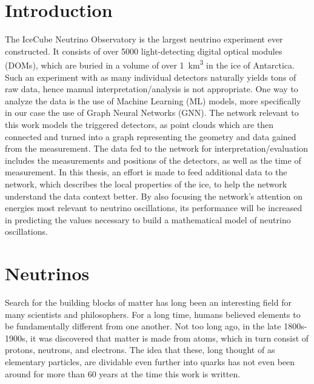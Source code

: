 \documentclass[a4paper,10pt]{scrartcl}
\begin{document}
\thispagestyle{empty}
\newpage

\tableofcontents

\newpage



\section{Introduction}

The IceCube Neutrino Observatory is the largest neutrino experiment ever constructed.
It consists of over 5000 light-detecting digital optical modules (DOMs), which are buried in a volume of over \SI{1}{km^3} in the ice of Antarctica.
Such an experiment with as many individual detectors naturally yields tons of raw data, hence manual interpretation/analysis is not appropriate.
One way to analyze the data is the use of Machine Learning (ML) models, more specifically in our case the use of Graph Neural Networks (GNN).
The network relevant to this work models the triggered detectors, as point clouds which are then connected and turned into a graph representing the geometry and data gained from the measurement.
The data fed to the network for interpretation/evaluation includes the measurements and positions of the detectors, as well as the time of measurement.
In this thesis, an effort is made to feed additional data to the network, which describes the local properties of the ice, to help the network understand the data context better.
By also focusing the network's attention on energies most relevant to neutrino oscillations, its performance will be increased in predicting the values necessary to build a mathematical model of neutrino oscillations.

\section{Neutrinos}

Search for the building blocks of matter has long been an interesting field for many scientists and philosophers.
For a long time, humans believed elements to be fundamentally different from one another.
Not too long ago, in the late 1800s-1900s, it was discovered that matter is made from atoms, which in turn consist of protons, neutrons, and electrons.
The idea that these, long thought of as elementary particles, are dividable even further into quarks has not even been around for more than 60 years at the time this work is written.
\end{document}
